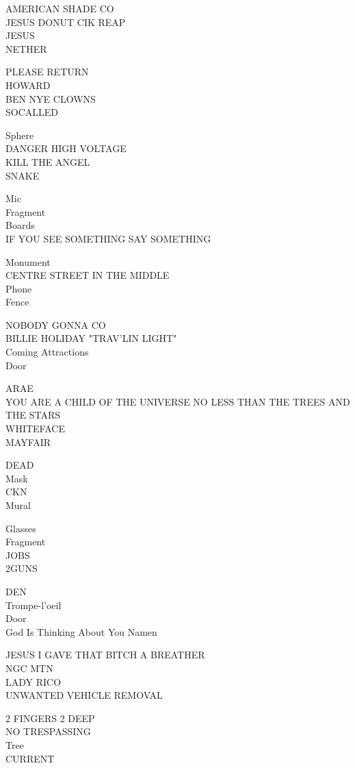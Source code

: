 \documentclass[10pt,letterpaper]{article}
\begin{document}
AMERICAN SHADE CO\\
JESUS DONUT CIK REAP\\
JESUS\\
NETHER

PLEASE RETURN\\
HOWARD\\
BEN NYE CLOWNS\\
SOCALLED

Sphere\\
DANGER HIGH VOLTAGE\\
KILL THE ANGEL\\
SNAKE

Mic\\
Fragment\\
Boards\\
IF YOU SEE SOMETHING SAY SOMETHING

Monument\\
CENTRE STREET IN THE MIDDLE\\
Phone\\
Fence

NOBODY GONNA CO\\
BILLIE HOLIDAY "TRAV'LIN LIGHT"\\
Coming Attractions\\
Door

ARAE\\
YOU ARE A CHILD OF THE UNIVERSE NO LESS THAN THE TREES AND THE STARS\\
WHITEFACE\\
MAYFAIR

DEAD\\
Mask\\
CKN\\
Mural

Glasses\\
Fragment\\
JOBS\\
2GUNS

DEN\\
Trompe{-}l'oeil\\
Door\\
God Is Thinking About You Namen

JESUS I GAVE THAT BITCH A BREATHER\\
NGC MTN\\
LADY RICO\\
UNWANTED VEHICLE REMOVAL

2 FINGERS 2 DEEP\\
NO TRESPASSING\\
Tree\\
CURRENT
\end{document}
